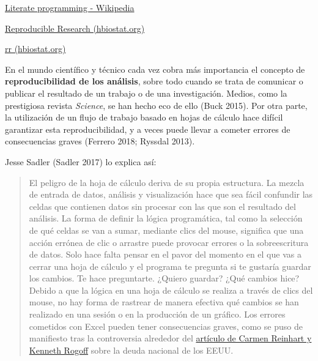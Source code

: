 \documentclass[
  letterpaper,
  DIV=11,
  numbers=noendperiod,
  oneside]{scrreprt}
\begin{document}
\href{https://en.wikipedia.org/wiki/Literate_programming}{Literate
programming - Wikipedia}

\href{https://hbiostat.org/rr/\#reproducible-research-bbr-chapter-21}{Reproducible
Research (hbiostat.org)}

\href{https://hbiostat.org/rr/\#reproducible-research-bbr-chapter-21}{rr
(hbiostat.org)}

En el mundo científico y técnico cada vez cobra más importancia el
concepto de \textbf{reproducibilidad de los análisis}, sobre todo cuando
se trata de comunicar o publicar el resultado de un trabajo o de una
investigación. Medios, como la prestigiosa revista \emph{Science}, se
han hecho eco de ello (Buck 2015). Por otra parte, la utilización de un
flujo de trabajo basado en hojas de cálculo hace difícil garantizar esta
reproducibilidad, y a veces puede llevar a cometer errores de
consecuencias graves (Ferrero 2018; Ryssdal 2013).

Jesse Sadler (Sadler 2017) lo explica así:

\begin{quote}
El peligro de la hoja de cálculo deriva de su propia estructura. La
mezcla de entrada de datos, análisis y visualización hace que sea fácil
confundir las celdas que contienen datos sin procesar con las que son el
resultado del análisis. La forma de definir la lógica programática, tal
como la selección de qué celdas se van a sumar, mediante clics del
mouse, significa que una acción errónea de clic o arrastre puede
provocar errores o la sobreescritura de datos. Solo hace falta pensar en
el pavor del momento en el que vas a cerrar una hoja de cálculo y el
programa te pregunta si te gustaría guardar los cambios. Te hace
preguntarte. ¿Quiero guardar? ¿Qué cambios hice? Debido a que la lógica
en una hoja de cálculo se realiza a través de clics del mouse, no hay
forma de rastrear de manera efectiva qué cambios se han realizado en una
sesión o en la producción de un gráfico. Los errores cometidos con Excel
pueden tener consecuencias graves, como se puso de manifiesto tras la
controversia alrededor del
\href{https://nadaesgratis.es/garicano/el-error-de-reinhardt-y-rogoff}{artículo
de Carmen Reinhart y Kenneth Rogoff} sobre la deuda nacional de los
EEUU.
\end{quote}
\end{document}
